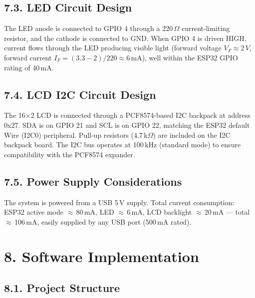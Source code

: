 \documentclass[12pt]{article}
\begin{document}
\subsection*{7.3. LED Circuit Design}

The LED anode is connected to GPIO 4 through a 220\,$\Omega$ current-limiting resistor, and the cathode is connected to GND. When GPIO 4 is driven HIGH, current flows through the LED producing visible light (forward voltage $V_F \approx 2\,V$, forward current $I_F = (3.3 - 2) / 220 \approx 6\,\mathrm{mA}$), well within the ESP32 GPIO rating of 40\,mA.

\subsection*{7.4. LCD I2C Circuit Design}

The 16×2 LCD is connected through a PCF8574-based I2C backpack at address 0x27. SDA is on GPIO 21 and SCL is on GPIO 22, matching the ESP32 default Wire (I2C0) peripheral. Pull-up resistors (4.7\,k$\Omega$) are included on the I2C backpack board. The I2C bus operates at 100\,kHz (standard mode) to ensure compatibility with the PCF8574 expander.

\subsection*{7.5. Power Supply Considerations}

The system is powered from a USB 5\,V supply. Total current consumption: ESP32 active mode $\approx$\,80\,mA, LED $\approx$\,6\,mA, LCD backlight $\approx$\,20\,mA — total $\approx$\,106\,mA, easily supplied by any USB port (500\,mA rated).

\section*{8. Software Implementation}

\subsection*{8.1. Project Structure}
\end{document}
